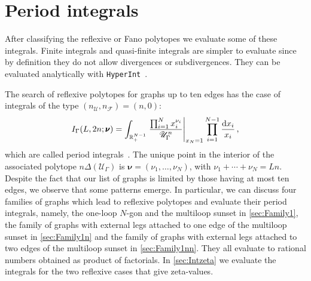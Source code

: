 \documentclass[12pt,a4paper]{article}
\theoremstyle{plain}
\theoremstyle{remark}
\newcommand{\nprops}{N}
\newcommand{\dd}{\mathrm{d}}
\newcommand{\cU}{\mathscr {U}}
\newcommand{\cF}{\mathscr {F}}
\newcommand{\undernotation}[1]{\pmb{#1}}
\newcommand{\Newton}{\Delta}
\begin{document}
\section{Period integrals}\label{sec:periods}
After classifying the reflexive or Fano polytopes we evaluate some of these integrals. Finite integrals and quasi-finite integrals are simpler to evaluate since by definition they do not allow divergences or subdivergences. They can be  evaluated analytically  with {\tt HyperInt}~\cite{Panzer:2014caa}.


The search of reflexive polytopes for graphs up to ten edges
has the case of integrals of the type $(n_\cU, n_\cF) = (n,0)$:
\begin{equation}
 I_\Gamma(L,2n;\undernotation{\nu})= \int_{\mathbb R^{\nprops-1}_+}
\left. {\prod_{i=1}^{\nprops} x_i^{\nu_i}\over \cU_\Gamma^n }\right|_{x_\nprops=1} 
\prod_{i=1}^{\nprops-1}{\dd x_i\over x_i}\, ,
\end{equation}
which are called  period integrals~\cite{Bloch:2005bh}.
The unique point in the interior of the associated polytope $n\Newton(\cU_\Gamma)$ is  $\undernotation{\nu}=(\nu_1,\dots,\nu_\nprops)$, with  $\nu_1+\cdots+\nu_\nprops=Ln$. Despite the fact that our list of graphs is limited by those having at most  ten edges, we observe that some patterns emerge.  In particular, we can discuss four families of graphs which lead to reflexive polytopes and evaluate their period integrals, namely, the one-loop $\nprops$-gon and the multiloop sunset in \cref{sec:Family1}, the family of graphs with external legs attached to one edge  of the multiloop sunset in \cref{sec:Family1n} and the family of graphs with external legs attached to two edges of the multiloop sunset in \cref{sec:Family1nn}.  They all evaluate to rational numbers obtained as product of factorials. In \cref{sec:Intzeta} we evaluate the integrals for the two reflexive cases that give zeta-values.
\end{document}
